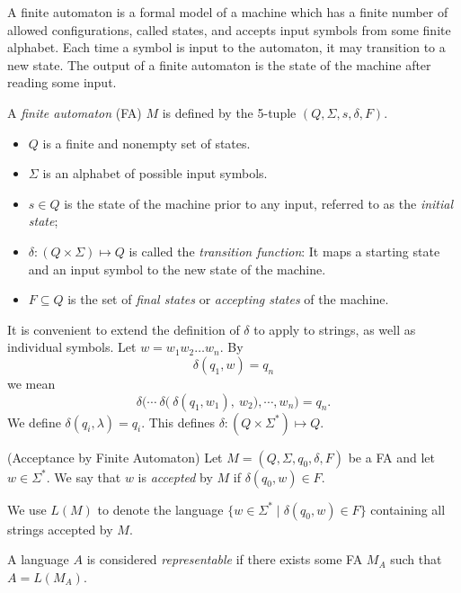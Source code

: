 \documentclass{bcthesis}
\newcommand{\footcite}[2]{\footnote{\cite[pg.~{#2}]{#1}}}
\renewcommand{\footcite}[2]{\cite[pg.~{#2}]{#1}}
\begin{document}

\label{ch:finite_automata}

	A finite automaton is a formal model of a machine which has a finite number of allowed configurations, called states, and accepts input symbols from some finite alphabet. 
	Each time a symbol is input to the automaton, it may transition to a new state. 
	The output of a finite automaton is the state of the machine after reading some input.

	\begin{definition}
		A \textit{finite automaton} (FA) $M$ is defined by the 5-tuple $(Q, \Sigma, s, \delta, F)$.
		\begin{itemize}
			\item [] $Q$ is a finite and nonempty set of states.
			\item [] $\Sigma$ is an alphabet of possible input symbols.
			\item [] $s \in Q$ is the state of the machine prior to any input, referred to as the \textit{initial state};
			\item [] $\delta: (Q \times \Sigma) \mapsto Q$ is called the \textit{transition function}: It maps a starting state and an input symbol to the new state of the machine.
			\item [] $F \subseteq Q$ is the set of \textit{final states} or \textit{accepting states} of the machine.
		\end{itemize}
		\footcite{hopcroft}{17}
	\end{definition}

	\begin{remark}
		It is convenient to extend the definition of $\delta$ to apply to strings, as well as individual symbols.
		Let $w = w_1 w_2 \dots w_n$.
		By 
		\[
			\delta(q_1, w) = q_n
		\] 
		we mean 
		\[
			\delta\bigg( \cdots \ \delta\Big( \ \delta(q_1, w_1), \ w_2 \Big), \cdots, w_n \bigg) = q_n.
		\]
		We define $\delta(q_i, \lambda) = q_i$.
		This defines $\delta: (Q \times \Sigma^*) \mapsto Q$.\footcite{hopcroft}{17}
	\end{remark}

	\begin{definition}(Acceptance by Finite Automaton)
		Let $M = (Q, \Sigma, q_0, \delta, F)$ be a FA and let $w \in \Sigma^*$.
		We say that $w$ is \textit{accepted} by $M$ if $\delta(q_0, w) \in F$.\footcite{hopcroft}{18}

		We use $L(M)$ to denote the language $\{ w \in \Sigma^* \mid \delta(q_0, w) \in F \}$ containing all strings accepted by $M$.\footcite{hopcroft}{18}

		A language $A$ is considered \textit{representable} if there exists some FA $M_A$ such that $A = L(M_A)$.\footcite{salomaa}{20}
	\end{definition}
\end{document}
